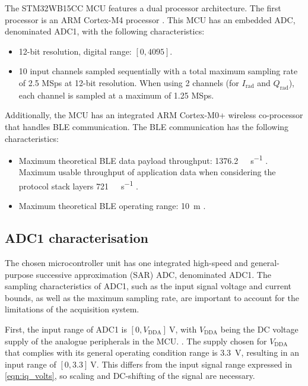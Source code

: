 The STM32WB15CC MCU features a dual processor architecture. The first processor is an ARM Cortex-M4 processor \cite{STMicroelectronics2022}. This MCU has an embedded ADC, denominated ADC1, with the following characteristics:
\begin{itemize}
	\item 12-bit resolution, digital range: $[0, 4095]$.
	\item 10 input channels sampled sequentially with a total maximum sampling rate of 2.5 MSps at 12-bit resolution. When using 2 channels (for $I_\mathrm{rad}$ and $Q_\mathrm{rad}$), each channel is sampled at a maximum of 1.25 MSps.
\end{itemize}

Additionally, the MCU has an integrated ARM Cortex-M0+ wireless co-processor that handles BLE communication. The BLE communication has the following characteristics:
\begin{itemize}
	\item Maximum theoretical BLE data payload throughput: \SI{1376.2}{\kilo\bit\per\second} \cite{NordicSemiconductor2019,Bluetooth52}. Maximum usable throughput of application data when considering the protocol stack layers \SI{721}{\kilo\bit\per\second} \cite{STMicroelectronics2022b}.
	\item Maximum theoretical BLE operating range: \SI{10}{\meter} \cite{Bluetooth52}.
\end{itemize}

\subsection{ADC1 characterisation}\label{sec:adc1-characterisation}

The chosen microcontroller unit has one integrated high-speed and general-purpose successive approximation (SAR) ADC, denominated ADC1. The sampling characteristics of ADC1, such as the input signal voltage and current bounds, as well as the maximum sampling rate, are important to account for the limitations of the acquisition system.

First, the input range of ADC1 is $[0, V_\mathrm{DDA}]\ \si{\volt}$, with $V_\mathrm{DDA}$ being the DC voltage supply of the analogue peripherals in the MCU.
\cite[p.~103]{STMicroelectronics2022}. The supply chosen for $V_\mathrm{DDA}$ that complies with its general operating condition range \cite[p.~62]{STMicroelectronics2022} is \SI{3.3}{\volt}, resulting in an input range of $[0, 3.3]\ \si{\volt}$. This differs from the input signal range expressed in \cref{eqn:iq_volts}, so scaling and DC-shifting of the signal are necessary.

